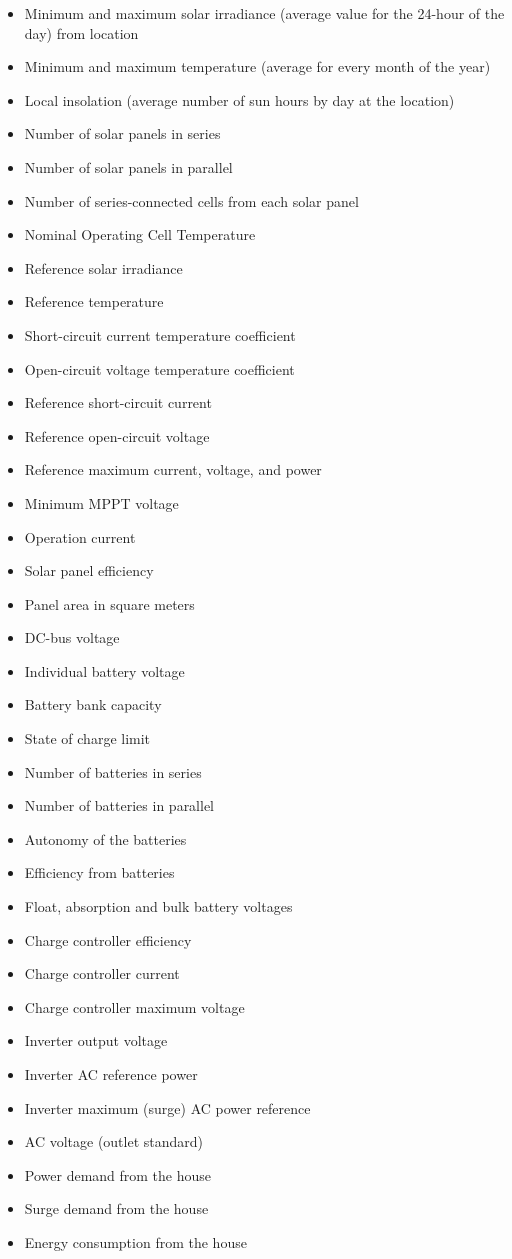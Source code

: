 \begin{itemize}
\item Minimum and maximum solar irradiance (average value for the 24-hour of the day) from location
\item Minimum and maximum temperature (average for every month of the year)
\item Local insolation (average number of sun hours by day at the location)
\item Number of solar panels in series
\item Number of solar panels in parallel
\item Number of series-connected cells from each solar panel
\item Nominal Operating Cell Temperature
\item Reference solar irradiance
\item Reference temperature
\item Short-circuit current temperature coefficient
\item Open-circuit voltage temperature coefficient
\item Reference short-circuit current
\item Reference open-circuit voltage
\item Reference maximum current, voltage, and power
\item Minimum MPPT voltage
\item Operation current
\item Solar panel efficiency
\item Panel area in square meters
\item DC-bus voltage
\item Individual battery voltage
\item Battery bank capacity
\item State of charge limit
\item Number of batteries in series
\item Number of batteries in parallel
\item Autonomy of the batteries
\item Efficiency from batteries
\item Float, absorption and bulk battery voltages
\item Charge controller efficiency
\item Charge controller current
\item Charge controller maximum voltage
\item Inverter output voltage
\item Inverter AC reference power
\item Inverter maximum (surge) AC power reference
\item AC voltage (outlet standard)
\item Power demand from the house
\item Surge demand from the house
\item Energy consumption from the house
\end{itemize}

